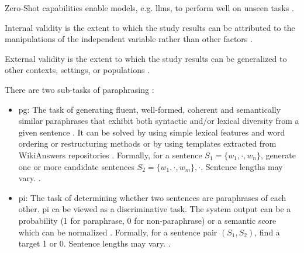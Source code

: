 \begin{definition}
    Zero-Shot capabilities enable models, e.g. \acp{llm}, to perform well on unseen tasks \cite{master_thesis_paraphrasing_2024}.
\end{definition}

\begin{definition}
    Internal validity is the extent to which the study results can be attributed 
    to the manipulations of the independent variable rather than other factors \cite{master_thesis_paraphrasing_2024}.
\end{definition}

\begin{definition}
    External validity is the extent to which the study results can be generalized 
    to other contexts, settings, or populations \cite{master_thesis_paraphrasing_2024}.
\end{definition}

\begin{definition}
    There are two sub-tasks of paraphrasing \cite{palivela_optimization_2021}:
    \begin{itemize}
        \item \ac{pg}: The task of generating fluent, well-formed, coherent and semantically similar paraphrases 
        that exhibit both syntactic and/or lexical diversity from a given sentence \cite{palivela_optimization_2021,kurt_pehlivanoglu_comparative_2024}. 
        It can be solved by using simple lexical features and word ordering or restructuring methods or 
        by using templates extracted from WikiAnswers repositories \cite{palivela_optimization_2021}.
        Formally, for a sentence $S_1=\{w_1, \cdot, w_n\}$, generate one or more candidate sentences $S_2=\{w_1, \cdot, w_m\}, \cdot$.
        Sentence lengths may vary. \cite{palivela_optimization_2021}.
        \item \ac{pi}: The task of determining whether two sentences are paraphrases of each other.
        \ac{pi} ca be viewed as a discriminative task. The system output can be a probability (1 for paraphrase, 0 for non-paraphrase) 
        or a semantic score which can be normalized \cite{palivela_optimization_2021}.
        Formally, for a sentence pair $(S_1, S_2)$, find a target 1 or 0. Sentence lengths may vary. \cite{palivela_optimization_2021}.
    \end{itemize}
\end{definition}

